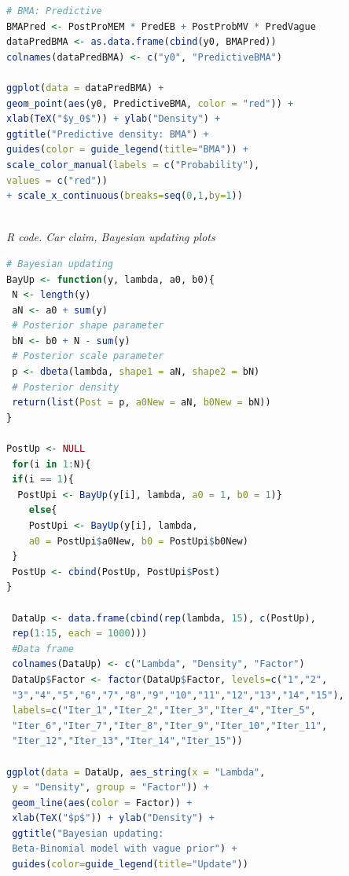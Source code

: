 \begin{enumerate}[leftmargin=*]
\begin{tcolorbox}[enhanced,width=4.67in,center upper,
	fontupper=\large\bfseries,drop shadow southwest,sharp corners]
\begin{VF}
\begin{lstlisting}[basicstyle=\scriptsize, language=R]
# BMA: Predictive
BMAPred <- PostProMEM * PredEB + PostProbMV * PredVague    
dataPredBMA <- as.data.frame(cbind(y0, BMAPred))
colnames(dataPredBMA) <- c("y0", "PredictiveBMA")

ggplot(data = dataPredBMA) + 
geom_point(aes(y0, PredictiveBMA, color = "red")) +  
xlab(TeX("$y_0$")) + ylab("Density") +
ggtitle("Predictive density: BMA") +
guides(color = guide_legend(title="BMA")) +
scale_color_manual(labels = c("Probability"), 
values = c("red")) 
+ scale_x_continuous(breaks=seq(0,1,by=1))
			
\end{lstlisting}
\end{VF}
\end{tcolorbox}

\begin{tcolorbox}[enhanced,width=4.67in,center upper,
	fontupper=\large\bfseries,drop shadow southwest,sharp corners]
	\textit{R code. Car claim, Bayesian updating plots}
\begin{VF}
\begin{lstlisting}[basicstyle=\scriptsize, language=R]
# Bayesian updating
BayUp <- function(y, lambda, a0, b0){
 N <- length(y)
 aN <- a0 + sum(y) 
 # Posterior shape parameter
 bN <- b0 + N - sum(y)    
 # Posterior scale parameter
 p <- dbeta(lambda, shape1 = aN, shape2 = bN) 
 # Posterior density
 return(list(Post = p, a0New = aN, b0New = bN))
}
			
PostUp <- NULL
 for(i in 1:N){
 if(i == 1){
  PostUpi <- BayUp(y[i], lambda, a0 = 1, b0 = 1)}
	else{
	PostUpi <- BayUp(y[i], lambda, 
	a0 = PostUpi$a0New, b0 = PostUpi$b0New)
 }
 PostUp <- cbind(PostUp, PostUpi$Post)
}
			
 DataUp <- data.frame(cbind(rep(lambda, 15), c(PostUp),
 rep(1:15, each = 1000))) 
 #Data frame
 colnames(DataUp) <- c("Lambda", "Density", "Factor")
 DataUp$Factor <- factor(DataUp$Factor, levels=c("1","2",
 "3","4","5","6","7","8","9","10","11","12","13","14","15"), 
 labels=c("Iter_1","Iter_2","Iter_3","Iter_4","Iter_5",
 "Iter_6","Iter_7","Iter_8","Iter_9","Iter_10","Iter_11",
 "Iter_12","Iter_13","Iter_14","Iter_15"))
			
ggplot(data = DataUp, aes_string(x = "Lambda", 
 y = "Density", group = "Factor")) + 
 geom_line(aes(color = Factor)) +
 xlab(TeX("$p$")) + ylab("Density") +
 ggtitle("Bayesian updating: 
 Beta-Binomial model with vague prior") +
 guides(color=guide_legend(title="Update")) 		
\end{lstlisting}
\end{VF}
\end{tcolorbox}



\end{enumerate}
